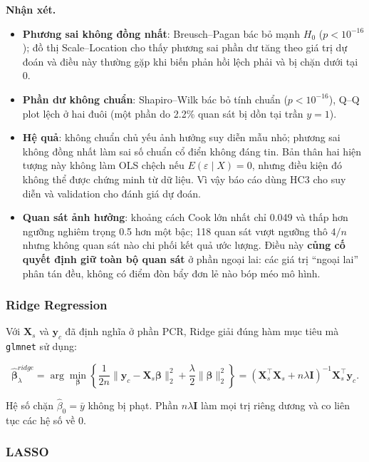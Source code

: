 \textbf{Nhận xét.}

\begin{itemize}
\tightlist
\item
  \textbf{Phương sai không đồng nhất}: Breusch--Pagan bác bỏ mạnh
  \(H_0\) (\(p < 10^{-16}\)); đồ thị Scale--Location cho thấy phương sai
  phần dư tăng theo giá trị dự đoán và điều này thường gặp khi biến phản
  hồi lệch phải và bị chặn dưới tại 0.
\item
  \textbf{Phần dư không chuẩn}: Shapiro--Wilk bác bỏ tính chuẩn
  (\(p < 10^{-16}\)), Q--Q plot lệch ở hai đuôi (một phần do 2.2\% quan
  sát bị dồn tại trần \(y = 1\)).
\item
  \textbf{Hệ quả}: không chuẩn chủ yếu ảnh hưởng suy diễn mẫu nhỏ;
  phương sai không đồng nhất làm sai số chuẩn cổ điển không đáng tin.
  Bản thân hai hiện tượng này không làm OLS chệch nếu
  \(E(\varepsilon\mid X)=0\), nhưng điều kiện đó không thể được chứng
  minh từ dữ liệu. Vì vậy báo cáo dùng HC3 cho suy diễn và validation
  cho đánh giá dự đoán.
\item
  \textbf{Quan sát ảnh hưởng}: khoảng cách Cook lớn nhất chỉ 0.049 và
  thấp hơn ngưỡng nghiêm trọng 0.5 hơn một bậc; 118 quan sát vượt ngưỡng
  thô \(4/n\) nhưng không quan sát nào chi phối kết quả ước lượng. Điều
  này \textbf{củng cố quyết định giữ toàn bộ quan sát} ở phần ngoại lai:
  các giá trị ``ngoại lai'' phân tán đều, không có điểm đòn bẩy đơn lẻ
  nào bóp méo mô hình.
\end{itemize}

\subsubsection{Ridge Regression}\label{ridge-regression}

Với \(\mathbf X_s\) và \(\mathbf y_c\) đã định nghĩa ở phần PCR, Ridge
giải đúng hàm mục tiêu mà \texttt{glmnet} sử dụng:

\[
\hat{\boldsymbol\beta}^{ridge}_\lambda
=\arg\min_{\boldsymbol\beta}\left\{
\frac{1}{2n}\|\mathbf y_c-\mathbf X_s\boldsymbol\beta\|_2^2
+\frac{\lambda}{2}\|\boldsymbol\beta\|_2^2\right\}
=(\mathbf X_s^\top\mathbf X_s+n\lambda\mathbf I)^{-1}\mathbf X_s^\top\mathbf y_c.
\]

Hệ số chặn \(\hat\beta_0=\bar y\) không bị phạt. Phần
\(n\lambda\mathbf I\) làm mọi trị riêng dương và co liên tục các hệ số
về 0.

\subsubsection{LASSO}\label{lasso}

